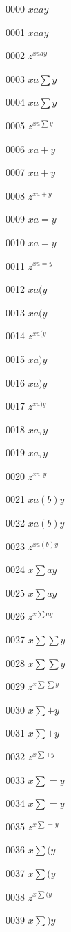 \documentclass{article}
\begin{document}
0000 $\displaystyle xaay$\par
0001 $xaay$\par
0002 $z^{xaay}$\par
0003 $\displaystyle xa\sum y$\par
0004 $xa\sum y$\par
0005 $z^{xa\sum y}$\par
0006 $\displaystyle xa+y$\par
0007 $xa+y$\par
0008 $z^{xa+y}$\par
0009 $\displaystyle xa=y$\par
0010 $xa=y$\par
0011 $z^{xa=y}$\par
0012 $\displaystyle xa(y$\par
0013 $xa(y$\par
0014 $z^{xa(y}$\par
0015 $\displaystyle xa)y$\par
0016 $xa)y$\par
0017 $z^{xa)y}$\par
0018 $\displaystyle xa,y$\par
0019 $xa,y$\par
0020 $z^{xa,y}$\par
0021 $\displaystyle xa\left(b\right) y$\par
0022 $xa\left(b\right) y$\par
0023 $z^{xa\left(b\right) y}$\par
0024 $\displaystyle x\sum ay$\par
0025 $x\sum ay$\par
0026 $z^{x\sum ay}$\par
0027 $\displaystyle x\sum \sum y$\par
0028 $x\sum \sum y$\par
0029 $z^{x\sum \sum y}$\par
0030 $\displaystyle x\sum +y$\par
0031 $x\sum +y$\par
0032 $z^{x\sum +y}$\par
0033 $\displaystyle x\sum =y$\par
0034 $x\sum =y$\par
0035 $z^{x\sum =y}$\par
0036 $\displaystyle x\sum (y$\par
0037 $x\sum (y$\par
0038 $z^{x\sum (y}$\par
0039 $\displaystyle x\sum )y$\par
\end{document}
